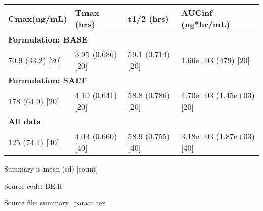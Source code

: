 \setlength{\tabcolsep}{5pt} 
\begin{threeparttable}
\renewcommand{\arraystretch}{1.3}
\begin{tabular}[h]{llll}
\hline
\textbf{Cmax(ng/mL)} & \textbf{Tmax (hrs)} & \textbf{t1/2 (hrs)} & \textbf{AUCinf (ng*hr/mL)} \\
\hline
\multicolumn{4}{l}{\textbf{Formulation: BASE}}\\%
70.9 (33.2) [20] & 3.95 (0.686) [20] & 59.1 (0.714) [20] & 1.66e+03 (479) [20] \\
\hline \multicolumn{4}{l}{\textbf{Formulation: SALT}}\\%
178 (64.9) [20] & 4.10 (0.641) [20] & 58.8 (0.786) [20] & 4.70e+03 (1.45e+03) [20] \\
\hline \multicolumn{4}{l}{\textbf{All data}}\\%
125 (74.4) [40] & 4.03 (0.660) [40] & 58.9 (0.755) [40] & 3.18e+03 (1.87e+03) [40] \\
\hline
\end{tabular}
\begin{tablenotes}[flushleft]
\item Summary is mean (sd) [count]
\item Source code: BE.R
\item Source file: summary\_param.tex
\end{tablenotes}
\end{threeparttable}
